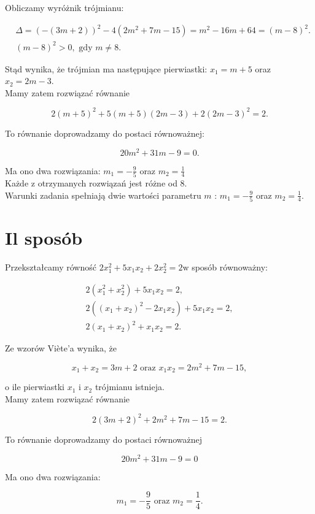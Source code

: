 \documentclass[10pt]{article}
\begin{document}
Obliczamy wyróżnik trójmianu:

$$
\begin{aligned}
& \Delta=(-(3 m+2))^{2}-4\left(2 m^{2}+7 m-15\right)=m^{2}-16 m+64=(m-8)^{2} . \\
&(m-8)^{2}>0, \text { gdy } m \neq 8 .
\end{aligned}
$$

Stąd wynika, że trójmian ma następujące pierwiastki: $x_{1}=m+5$ oraz $x_{2}=2 m-3$.\\
Mamy zatem rozwiązać równanie

$$
2(m+5)^{2}+5(m+5)(2 m-3)+2(2 m-3)^{2}=2 .
$$

To równanie doprowadzamy do postaci równoważnej:

$$
20 m^{2}+31 m-9=0 .
$$

Ma ono dwa rozwiązania: $m_{1}=-\frac{9}{5}$ oraz $m_{2}=\frac{1}{4}$\\
Każde z otrzymanych rozwiązań jest różne od 8.\\
Warunki zadania spełniają dwie wartości parametru $m$ : $m_{1}=-\frac{9}{5}$ oraz $m_{2}=\frac{1}{4}$.

\section*{Il sposób}
Przekształcamy równość $2 x_{1}^{2}+5 x_{1} x_{2}+2 x_{2}^{2}=2 \mathrm{w}$ sposób równoważny:

$$
\begin{gathered}
2\left(x_{1}^{2}+x_{2}^{2}\right)+5 x_{1} x_{2}=2, \\
2\left(\left(x_{1}+x_{2}\right)^{2}-2 x_{1} x_{2}\right)+5 x_{1} x_{2}=2, \\
2\left(x_{1}+x_{2}\right)^{2}+x_{1} x_{2}=2 .
\end{gathered}
$$

Ze wzorów Viète'a wynika, że

$$
x_{1}+x_{2}=3 m+2 \text { oraz } x_{1} x_{2}=2 m^{2}+7 m-15,
$$

o ile pierwiastki $x_{1}$ i $x_{2}$ trójmianu istnieja.\\
Mamy zatem rozwiązać równanie

$$
2(3 m+2)^{2}+2 m^{2}+7 m-15=2 .
$$

To równanie doprowadzamy do postaci równoważnej

$$
20 m^{2}+31 m-9=0
$$

Ma ono dwa rozwiązania:

$$
m_{1}=-\frac{9}{5} \text { oraz } m_{2}=\frac{1}{4} .
$$
\end{document}
